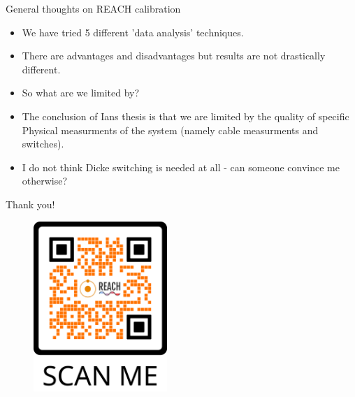 \documentclass[aspectratio=169]{beamer}
\begin{document}
\begin{frame}{\small{General thoughts on REACH calibration}}
	\begin{itemize}
		\item We have tried 5 different 'data analysis' techniques.
		\item There are advantages and disadvantages but results are not drastically different.
		\item So what are we limited by?
		\item The conclusion of Ians thesis is that we are limited by the quality of specific Physical measurments of the system (namely cable measurments and switches).
		\item I do not think Dicke switching is needed at all - can someone convince me otherwise?
	\end{itemize}

\end{frame}

\begin{frame}{\small{Thank you!}}
	\begin{figure}
		\centering
		\includegraphics[width=0.45\textwidth]{qr.png}
	\end{figure}
\end{frame}
\end{document}

